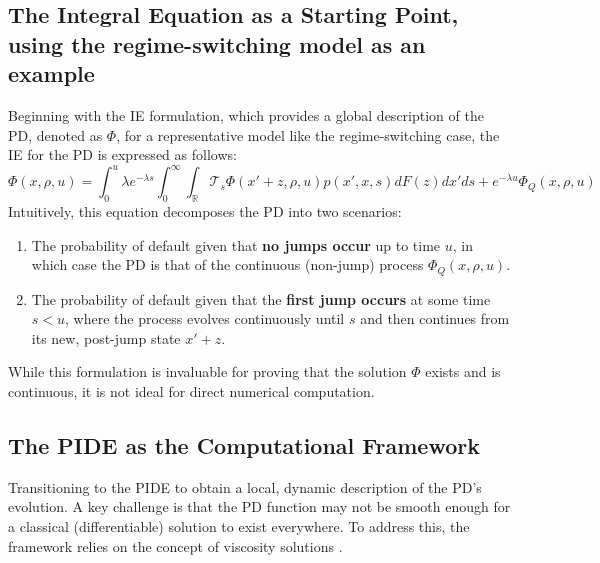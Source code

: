 \documentclass[11pt,twoside,openright]{report}
\begin{document}
\subsection{The Integral Equation as a Starting Point, using the regime-switching model as an example}

Beginning \cite{georgiou2023thesis} with the IE formulation, which provides a global description of the PD, denoted as $\Phi$, for a representative model like the regime-switching case, the IE for the PD is expressed as follows:
\begin{equation}
\Phi(x,\rho,u) = \int_{0}^{u}\lambda e^{-\lambda s}\int_{0}^{\infty}\int_{\mathbb{R}}\mathcal{T}_{s}\Phi(x'+z,\rho,u)p(x',x,s)dF(z)dx'ds + e^{-\lambda u}\Phi_Q(x,\rho,u)
\label{eq:ie_regime_switching_PD}
\end{equation}
Intuitively, this equation decomposes the PD into two scenarios:
\begin{enumerate}
    \item The probability of default given that \textbf{no jumps occur} up to time $u$, in which case the PD is that of the continuous (non-jump) process $\Phi_Q(x, \rho, u)$.
    \item The probability of default given that the \textbf{first jump occurs} at some time $s < u$, where the process evolves continuously until $s$ and then continues from its new, post-jump state $x'+z$.
\end{enumerate}
While this formulation is invaluable for proving that the solution $\Phi$ exists and is continuous, it is not ideal for direct numerical computation.

\subsection*{The PIDE as the Computational Framework}

Transitioning to the PIDE to obtain a local, dynamic description of the PD's evolution. A key challenge is that the PD function may not be smooth enough for a classical (differentiable) solution to exist everywhere. To address this, the framework relies on the concept of viscosity solutions \cite{hamadene2016viscosity}.
\end{document}

